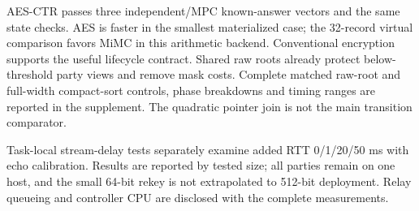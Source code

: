 AES-CTR passes three independent/MPC known-answer vectors and the same state checks. AES is faster in the smallest materialized case; the 32-record virtual comparison favors MiMC in this arithmetic backend. Conventional encryption supports the useful lifecycle contract. Shared raw roots already protect below-threshold party views and remove mask costs. Complete matched raw-root and full-width compact-sort controls, phase breakdowns and timing ranges are reported in the supplement. The quadratic pointer join is not the main transition comparator.

Task-local stream-delay tests separately examine added RTT 0/1/20/50 ms with echo calibration. Results are reported by tested size; all parties remain on one host, and the small 64-bit rekey is not extrapolated to 512-bit deployment. Relay queueing and controller CPU are disclosed with the complete measurements.
